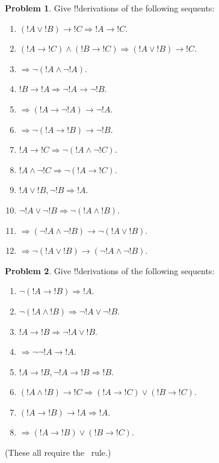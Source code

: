 \documentclass[10pt,a4paper]{article}
\theoremstyle{plain}
\theoremstyle{definition}
\newtheorem{prob}{Problem}[section]
\theoremstyle{remark}
\providecommand{\lif}{\mathbin{\rightarrow}}
\providecommand{\Sequent}{\mathrel{\Rightarrow}}
\providecommand{\RightR}[1]{}
\providecommand{\RightR}{\mathrm{R}}
\begin{document}
\begin{prob}
Give !!{derivation}s of the following sequents:
\begin{enumerate}
\item $(!A \lor !B) \lif !C \Sequent !A \lif !C$.
\item $(!A \lif !C) \land (!B \lif !C) \Sequent (!A \lor !B) \lif !C$.
\item $\Sequent \lnot(!A \land \lnot !A)$.
\item $!B \lif !A \Sequent \lnot !A \lif \lnot !B$.
\item $\Sequent (!A \lif \lnot !A) \lif \lnot !A$.
\item $\Sequent \lnot(!A \lif !B) \lif \lnot !B$.
\item $!A \lif !C \Sequent \lnot (!A \land \lnot !C)$.
\item $!A \land \lnot !C \Sequent \lnot (!A \lif !C)$.
\item $!A \lor !B, \lnot !B \Sequent !A$.
\item $\lnot !A \lor \lnot !B \Sequent \lnot(!A \land !B)$.
\item $\Sequent (\lnot !A \land \lnot !B) \lif\lnot(!A \lor !B)$.
\item $\Sequent \lnot(!A \lor !B) \lif (\lnot !A \land \lnot !B)$.
\end{enumerate}
\end{prob}

\begin{prob}
Give !!{derivation}s of the following sequents:
\begin{enumerate}
\item $\lnot(!A \lif !B) \Sequent !A$.
\item $\lnot(!A \land !B) \Sequent \lnot !A \lor \lnot !B$.
\item $!A \lif !B \Sequent \lnot !A \lor !B$.
\item $\Sequent \lnot \lnot !A \lif !A$.
\item $!A \lif !B, \lnot !A \lif !B \Sequent !B$.
\item $(!A \land !B) \lif !C \Sequent (!A \lif !C) \lor (!B \lif !C)$.
\item $(!A \lif !B) \lif !A \Sequent !A$.
\item $\Sequent (!A \lif !B) \lor (!B \lif !C)$.
\end{enumerate}
(These all require the $\RightR{\Contraction}$~rule.)
\end{prob}

\end{document}
